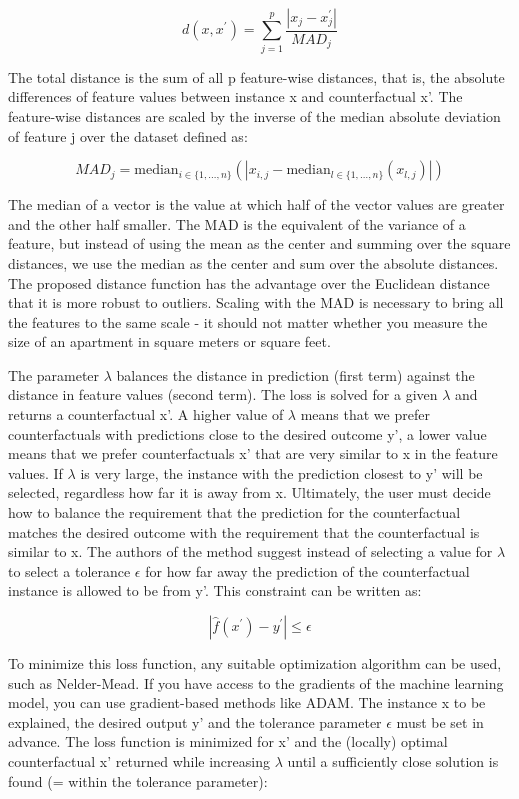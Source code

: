 \documentclass[12pt,]{krantz}
\begin{document}
\[d(x,x^\prime)=\sum_{j=1}^p\frac{|x_j-x^\prime_j|}{MAD_j}\]

The total distance is the sum of all p feature-wise distances, that is,
the absolute differences of feature values between instance x and
counterfactual x'. The feature-wise distances are scaled by the inverse
of the median absolute deviation of feature j over the dataset defined
as:

\[MAD_j=\text{median}_{i\in{}\{1,\ldots,n\}}(|x_{i,j}-\text{median}_{l\in{}\{1,\ldots,n\}}(x_{l,j})|)\]

The median of a vector is the value at which half of the vector values
are greater and the other half smaller. The MAD is the equivalent of the
variance of a feature, but instead of using the mean as the center and
summing over the square distances, we use the median as the center and
sum over the absolute distances. The proposed distance function has the
advantage over the Euclidean distance that it is more robust to
outliers. Scaling with the MAD is necessary to bring all the features to
the same scale - it should not matter whether you measure the size of an
apartment in square meters or square feet.

The parameter \(\lambda\) balances the distance in prediction (first
term) against the distance in feature values (second term). The loss is
solved for a given \(\lambda\) and returns a counterfactual x'. A higher
value of \(\lambda\) means that we prefer counterfactuals with
predictions close to the desired outcome y', a lower value means that we
prefer counterfactuals x' that are very similar to x in the feature
values. If \(\lambda\) is very large, the instance with the prediction
closest to y' will be selected, regardless how far it is away from x.
Ultimately, the user must decide how to balance the requirement that the
prediction for the counterfactual matches the desired outcome with the
requirement that the counterfactual is similar to x. The authors of the
method suggest instead of selecting a value for \(\lambda\) to select a
tolerance \(\epsilon\) for how far away the prediction of the
counterfactual instance is allowed to be from y'. This constraint can be
written as:

\[|\hat{f}(x^\prime)-y^\prime|\leq\epsilon\]

To minimize this loss function, any suitable optimization algorithm can
be used, such as Nelder-Mead. If you have access to the gradients of the
machine learning model, you can use gradient-based methods like ADAM.
The instance x to be explained, the desired output y' and the tolerance
parameter \(\epsilon\) must be set in advance. The loss function is
minimized for x' and the (locally) optimal counterfactual x' returned
while increasing \(\lambda\) until a sufficiently close solution is
found (= within the tolerance parameter):
\end{document}
